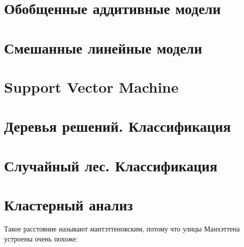 \documentclass[
  letterpaper,
  DIV=11,
  numbers=noendperiod]{scrreprt}
\theoremstyle{definition}
\theoremstyle{remark}
\begin{document}

\chapter{Обобщенные аддитивные модели}\label{andan-gam}


\chapter{Смешанные линейные модели}\label{andan-glmm}


\chapter{Support Vector Machine}\label{andan-svm}


\chapter{Деревья решений. Классификация}\label{andan-treesclass}


\chapter{Случайный лес. Классификация}\label{andan-randforestclass}


\chapter{Кластерный анализ}\label{andan-cluster}

Такое расстояние называют мантэттеновским, потому что улицы Манхэттена
устроены очень похоже:
\end{document}

